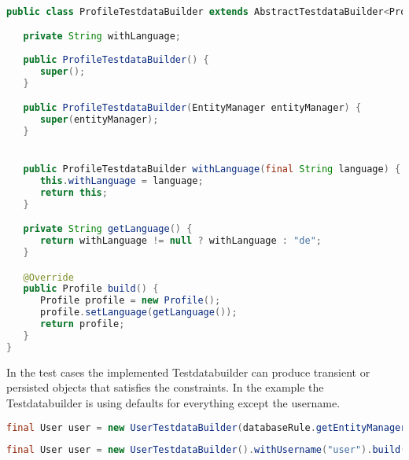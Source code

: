 \begin{lstlisting}[language={JAVA},caption=Profile Testdatabuilder]

public class ProfileTestdataBuilder extends AbstractTestdataBuilder<Profile> {

   private String withLanguage;
   
   public ProfileTestdataBuilder() {
      super();
   }

   public ProfileTestdataBuilder(EntityManager entityManager) {
      super(entityManager);
   }


   public ProfileTestdataBuilder withLanguage(final String language) {
      this.withLanguage = language;
      return this;
   }

   private String getLanguage() {
      return withLanguage != null ? withLanguage : "de";
   }

   @Override
   public Profile build() {
      Profile profile = new Profile();
      profile.setLanguage(getLanguage());
      return profile;
   }
}
\end{lstlisting}

In the test cases the implemented Testdatabuilder can produce transient or persisted objects that satisfies the constraints. In the example the Testdatabuilder is using defaults for everything except the username.

\begin{lstlisting}[language={JAVA},caption=Build an persistent User object]
final User user = new UserTestdataBuilder(databaseRule.getEntityManager()).withUsername("user").buildAndSave();
\end{lstlisting}

\begin{lstlisting}[language={JAVA},caption=Build an transient User object]
final User user = new UserTestdataBuilder().withUsername("user").build()
\end{lstlisting}
